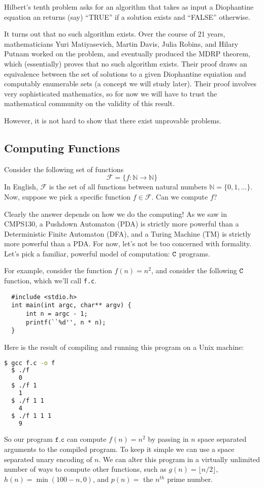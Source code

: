 \documentclass[english, 12pt]{article}
\begin{document}
  Hilbert's tenth problem asks for an algorithm that takes as input a 
  Diophantine equation an returns (say) ``TRUE'' if a solution exists and
  ``FALSE'' otherwise. \n

  It turns out that no such algorithm exists. Over the course of 21 years,
  mathematicians Yuri Matiyasevich, Martin Davis, Julia Robins, and Hilary
  Putnam worked on the problem, and eventually produced the MDRP theorem,
  which (essentially) proves that no such algorithm exists. Their proof 
  draws an equivalence between the set of solutions to a given Diophantine
  equiation and computably enumerable sets (a concept we will study later).
  Their proof involves very sophisticated mathematics, so for now we will
  have to trust the mathematical community on the validity of this result.
  \n

  However, it is not hard to show that there exist unprovable problems.
  \subsection{Computing Functions}
  Consider the following set of functions
  \[ \mathcal{F} = \{ f : \mathbb{N} \rightarrow \mathbb{N} \} \]
  In English, $\mathcal{F}$ is the set of all functions between natural
  numbers \(\mathbb{N} = \{0, 1, \dots \} \).
  Now, suppose we pick a specific function $f \in \mathcal{F}$. Can we
  compute $f$? \n

  Clearly the answer depends on how we do the computing! As we saw in
  CMPS130, a Pushdown Automaton (PDA) is strictly more powerful than a
  Deterministic Finite Automaton (DFA), and a Turing Machine (TM) is
  strictly more powerful than a PDA. For now, let's not be too concerned
  with formality. Let's pick a familiar, powerful model of computation:
  ${\texttt{C}}$ programs. \n

  For example, consider the function \(f(n) = n^2\), and consider the 
  following ${\texttt{C}}$ function, which we'll call \texttt{f.c}.
  \begin{lstlisting}
  #include <stdio.h>
  int main(int argc, char** argv) {
      int n = argc - 1;
      printf(``%d'', n * n);
  }
  \end{lstlisting}
  Here is the result of compiling and running this program on a Unix machine:
  \begin{lstlisting}[language=bash]
  $ gcc f.c -o f
  $ ./f
    0
  $ ./f 1
    1
  $ ./f 1 1
    4
  $ ./f 1 1 1
    9
  \end{lstlisting}
  So our program $\texttt{f.c}$ can compute $f(n) = n^2$ by passing in 
  $n$ space separated arguments to the compiled program. To keep it simple we
  can use a space separated unary encoding of $n$. We can alter this program
  in a virtually unlimited number of ways to compute other functions, such
  as $g(n) = \lfloor n/2 \rfloor$, $h(n) = \min(100 - n, 0)$, and 
  $p(n) = $ the $n^{th}$ prime number.\n
\end{document}
